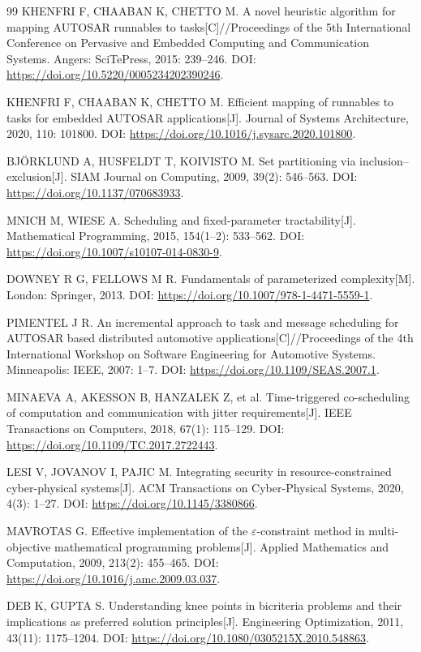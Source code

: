 \documentclass[UTF8,a4paper,twoside,zihao=-4]{ctexart}
\numberwithin{equation}{section}
\numberwithin{figure}{section}
\numberwithin{table}{section}
\theoremstyle{definition}
\numberwithin{algocf}{section}
\begin{document}
\begin{thebibliography}{99}
KHENFRI F, CHAABAN K, CHETTO M. A novel heuristic algorithm for mapping AUTOSAR runnables to tasks[C]//Proceedings of the 5th International Conference on Pervasive and Embedded Computing and Communication Systems. Angers: SciTePress, 2015: 239--246. DOI: \url{https://doi.org/10.5220/0005234202390246}.

KHENFRI F, CHAABAN K, CHETTO M. Efficient mapping of runnables to tasks for embedded AUTOSAR applications[J]. Journal of Systems Architecture, 2020, 110: 101800. DOI: \url{https://doi.org/10.1016/j.sysarc.2020.101800}.

BJÖRKLUND A, HUSFELDT T, KOIVISTO M. Set partitioning via inclusion--exclusion[J]. SIAM Journal on Computing, 2009, 39(2): 546--563. DOI: \url{https://doi.org/10.1137/070683933}.

MNICH M, WIESE A. Scheduling and fixed-parameter tractability[J]. Mathematical Programming, 2015, 154(1--2): 533--562. DOI: \url{https://doi.org/10.1007/s10107-014-0830-9}.

DOWNEY R G, FELLOWS M R. Fundamentals of parameterized complexity[M]. London: Springer, 2013. DOI: \url{https://doi.org/10.1007/978-1-4471-5559-1}.

PIMENTEL J R. An incremental approach to task and message scheduling for AUTOSAR based distributed automotive applications[C]//Proceedings of the 4th International Workshop on Software Engineering for Automotive Systems. Minneapolis: IEEE, 2007: 1--7. DOI: \url{https://doi.org/10.1109/SEAS.2007.1}.

MINAEVA A, AKESSON B, HANZALEK Z, et al. Time-triggered co-scheduling of computation and communication with jitter requirements[J]. IEEE Transactions on Computers, 2018, 67(1): 115--129. DOI: \url{https://doi.org/10.1109/TC.2017.2722443}.

LESI V, JOVANOV I, PAJIC M. Integrating security in resource-constrained cyber-physical systems[J]. ACM Transactions on Cyber-Physical Systems, 2020, 4(3): 1--27. DOI: \url{https://doi.org/10.1145/3380866}.

MAVROTAS G. Effective implementation of the $\varepsilon$-constraint method in multi-objective mathematical programming problems[J]. Applied Mathematics and Computation, 2009, 213(2): 455--465. DOI: \url{https://doi.org/10.1016/j.amc.2009.03.037}.

DEB K, GUPTA S. Understanding knee points in bicriteria problems and their implications as preferred solution principles[J]. Engineering Optimization, 2011, 43(11): 1175--1204. DOI: \url{https://doi.org/10.1080/0305215X.2010.548863}.


\end{thebibliography}
\end{document}
